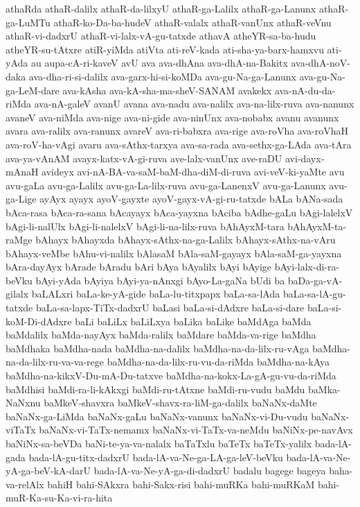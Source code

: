{athaRda
athaR-dalilx
athaR-da-lilxyU
athaR-ga-Lalilx
athaR-ga-Lanunx
athaR-ga-LuMTu
athaR-ko-Da-ba-hudeV
athaR-valalx
athaR-vanUnx
athaR-veVnu
athaR-vi-dadxrU
athaR-vi-lalx-vA-gu-tatxde
athavA
atheYR-sa-ba-hudu
atheYR-su-tAtxre
atiR-yiMda
atiVta
ati-reV-kada
ati-sha-ya-barx-hamxvu
ati-yAda
au
aupa-cA-ri-kaveV
avU
ava
ava-dhAna
ava-dhA-na-Bakitx
ava-dhA-noV-daka
ava-dha-ri-si-dalilx
ava-garx-hi-si-koMDa
ava-gu-Na-ga-Lanunx
ava-gu-Na-ga-LeM-dare
ava-kAsha
ava-kA-sha-ma-sheV-SANAM
avakekx
ava-nA-du-da-riMda
ava-nA-galeV
avanU
avana
ava-nadu
ava-nalilx
ava-na-lilx-ruva
ava-nanunx
avaneV
ava-niMda
ava-nige
ava-ni-gide
ava-ninUnx
ava-nobabx
avanu
avanunx
avara
ava-ralilx
ava-ranunx
avareV
ava-ri-babxra
ava-rige
ava-roVha
ava-roVhaH
ava-roV-ha-vAgi
avaru
ava-sAthx-tarxya
ava-sa-rada
ava-sethx-ga-LAda
ava-tAra
ava-ya-vAnAM
avayx-katx-vA-gi-ruva
ave-lalx-vanUnx
ave-raDU
avi-dayx-mAnaH
avideyx
avi-nA-BA-va-saM-baM-dha-diM-di-ruva
avi-veV-ki-yaMte
avu
avu-gaLa
avu-ga-Lalilx
avu-ga-La-lilx-ruva
avu-ga-LanenxV
avu-ga-Lanunx
avu-ga-Lige
ayAyx
ayayx
ayoV-gayxte
ayoV-gayx-vA-gi-ru-tatxde
bALa
bANa-sada
bAca-rasa
bAca-ra-sana
bAcayayx
bAca-yayxna
bAciba
bAdhe-gaLu
bAgi-lalelxV
bAgi-li-nalUlx
bAgi-li-nalelxV
bAgi-li-na-lilx-ruva
bAhAyxM-tara
bAhAyxM-ta-raMge
bAhayx
bAhayxda
bAhayx-sAthx-na-ga-Lalilx
bAhayx-sAthx-na-vAru
bAhayx-veMbe
bAhu-vi-nalilx
bAlasaM
bAla-saM-gayayx
bAla-saM-ga-yayxna
bAra-dayAyx
bArade
bAradu
bAri
bAya
bAyalilx
bAyi
bAyige
bAyi-lalx-di-ra-beVku
bAyi-yAda
bAyiya
bAyi-ya-nAnxgi
bAyo-La-gaNa
bUdi
ba
baDa-ga-vA-gilalx
baLALxri
baLa-ke-yA-gide
baLa-lu-titxpapx
baLa-sa-lAda
baLa-sa-lA-gu-tatxde
baLa-sa-lapx-TiTx-dadxrU
baLasi
baLa-si-dAdxre
baLa-si-dare
baLa-si-koM-Di-dAdxre
baLi
baLiLx
baLiLxya
baLika
baLike
baMdAga
baMda
baMdalilx
baMda-nayAyx
baMda-ralilx
baMdare
baMda-va-rige
baMdha
baMdhaka
baMdha-nada
baMdha-na-dalilx
baMdha-na-da-lilx-ru-vAga
baMdha-na-da-lilx-ru-va-va-rege
baMdha-na-da-lilx-ru-vu-da-riMda
baMdha-na-kAya
baMdha-na-kikxV-Du-mA-Du-tatxve
baMdha-na-kokx-La-gA-gu-vu-da-riMda
baMdhisi
baMdi-ra-li-kAkxgi
baMdi-ru-tAtxne
baMdi-ru-vudu
baMdu
baMka-NaNxnu
baMkeV-shavxra
baMkeV-shavx-ra-liM-ga-dalilx
baNaNx-daMte
baNaNx-ga-LiMda
baNaNx-gaLu
baNaNx-vanunx
baNaNx-vi-Du-vudu
baNaNx-viTaTx
baNaNx-vi-TaTx-nemamx
baNaNx-vi-TaTx-va-neMdu
baNiNx-pe-navAvx
baNiNx-sa-beVDa
baNi-te-ya-va-nalalx
baTaTxlu
baTeTx
baTeTx-yalilx
bada-lA-gada
bada-lA-gu-titx-dadxrU
bada-lA-va-Ne-ga-LA-ga-leV-beVku
bada-lA-va-Ne-yA-ga-beV-kA-darU
bada-lA-va-Ne-yA-ga-di-dadxrU
badalu
bagege
bageya
baha-va-relAlx
bahiH
bahi-SAkxra
bahi-Sakx-risi
bahi-muRKa
bahi-muRKaM
bahi-muR-Ka-su-Ka-vi-ra-hita
}

